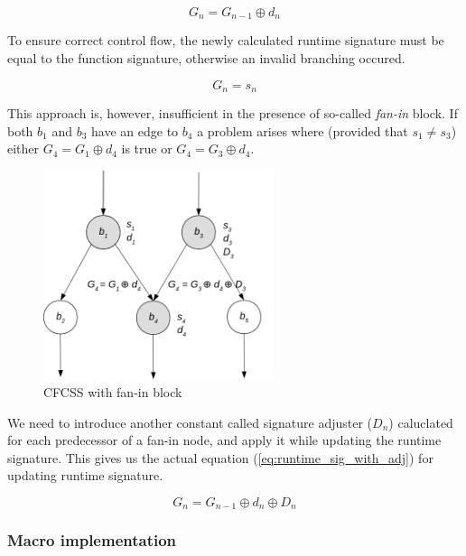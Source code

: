 \documentclass[12pt, letterpaper]{article}
\begin{document}
\begin{equation}
\label{eq:runtime_sig}
G_n = G_{n-1} \oplus d_n
\end{equation}

To ensure correct control flow, the newly calculated runtime signature must be equal to the function signature, otherwise an invalid branching occured.

\begin{equation}
\label{eq:sig_check}
G_n = s_n
\end{equation}

This approach is, however, insufficient in the presence of so-called \textit{fan-in} block. If both {$b_1$} and {$b_3$} have an edge to {$b_4$} a problem arises where (provided that {$s_1 \ne s_3$}) either {$G_4 = G_1 \oplus d_4$} is true or {$G_4 = G_3 \oplus d_4$}.

\begin{figure}[!h]
    \centering
    \includegraphics[width=0.6\textwidth]{diagrams/cfcss/adjuster.png}
    \caption{CFCSS with fan-in block \cite{coast:cfcss}}
\end{figure}

We need to introduce another constant called signature adjuster ({$D_n$}) caluclated for each predecessor of a fan-in node, and apply it while updating the runtime signature. This gives us the actual equation (\ref{eq:runtime_sig_with_adj}) for updating runtime signature.

\begin{equation}
\label{eq:runtime_sig_with_adj}
G_n = G_{n-1} \oplus d_n \oplus D_n
\end{equation}

\subsubsection{Macro implementation}
\end{document}
